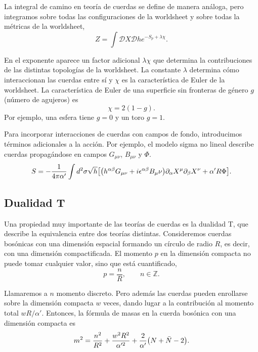La integral de camino en teoría de cuerdas se define de manera análoga, pero integramos 
sobre todas las configuraciones  de la worldsheet y sobre todas la métricas de la worldsheet,
\begin{equation}
  Z = \int \mathcal DX \mathcal Dh e^{-S_p+\lambda \chi}.
\end{equation}

En el exponente aparece un factor adicional $\lambda\chi$ que determina la
contribuciones de las distintas topologías de la worldsheet.
La constante $\lambda$ determina cómo interaccionan las cuerdas entre sí y $\chi$ es la característica
de Euler de la worldsheet.
La característica de Euler de una superficie sin fronteras de género $g$ (número de agujeros) es
\begin{equation}
  \chi = 2(1-g).
\end{equation}
Por ejemplo, una esfera tiene $g=0$ y un toro $g=1$.

Para incorporar interacciones de cuerdas con campos de fondo, introducimos términos adicionales a la acción.
Por ejemplo, el modelo sigma no lineal describe cuerdas propagándose en campos $G_{\mu\nu}$, $B_{\mu\nu}$ y $\Phi$.
\begin{equation}
  S = -\frac{1}{4\pi \alpha'}\int d^2 \sigma \sqrt h \qty[\qty(h^{\alpha\beta}G_{\mu\nu} + i\epsilon^{\alpha\beta}B_\mu\nu)\partial_\alpha X^\mu
  \partial_\beta X^\nu +\alpha'R\Phi].
\end{equation}

\subsection{Dualidad T}
\label{sec:dual}
Una propiedad muy importante de las teorías de cuerdas es la dualidad T,
que describe la equivalencia entre dos teorías distintas.
Consideremos cuerdas bosónicas con una dimensión espacial formando un círculo de radio $R$,
es decir, con una dimensión compactificada.
El momento $p$ en la dimensión compacta no puede tomar cualquier valor, sino que está cuantificado,
\begin{equation}
  p = \frac{n}{R}, \qquad n \in \mathbb Z.
\end{equation}

Llamaremos a $n$ momento discreto.
Pero además las cuerdas pueden enrollarse sobre la dimensión compacta $w$ veces, dando lugar
a la contribución al momento total $wR/\alpha'$.
Entonces, la fórmula de masas en la cuerda bosónica con una dimensión compacta es
\begin{equation}
  m^2 = \frac{n^2}{R^2} + \frac{w^2 R^2}{\alpha'^2} +\frac{2}{\alpha'}\qty(N+\bar N -2).
\end{equation}

